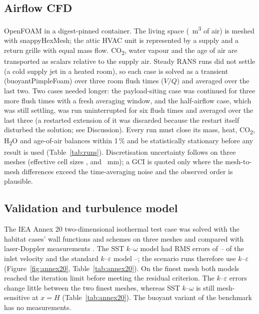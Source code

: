 \documentclass[11pt]{article}
\begin{document}
\subsection{Airflow CFD}
OpenFOAM \citep{openfoam2606} in a digest-pinned container. The living space (\BaseVolume{}~m\textsuperscript{3}
of air) is meshed with snappyHexMesh; the attic HVAC unit is represented by a supply and a return grille with equal
mass flow. CO\textsubscript{2}, water vapour and the age of air are transported as scalars relative to the supply
air. Steady RANS runs did not settle (a cold supply jet in a heated room), so each case is solved as a transient
(buoyantPimpleFoam) over three room flush times ($V/Q$) and averaged over the last two. Two cases needed longer:
the payload-siting case was continued for three more flush times with a fresh averaging window, and the half-airflow
case, which was still settling, was run uninterrupted for six flush times and averaged over the last three (a
restarted extension of it was discarded because the restart itself disturbed the solution; see Discussion). Every run must close its mass, heat,
CO\textsubscript{2}, H\textsubscript{2}O and age-of-air balances within 1\,\% and be statistically stationary before
any result is used (Table~\ref{tab:runs}). Discretisation uncertainty follows \citet{celik2008gci} on three meshes (effective cell sizes
\GciHFine, \GciHMed{} and \GciHCoarse~mm); a GCI is quoted only where the mesh-to-mesh differences exceed the
time-averaging noise and the observed order is plausible.

\begin{table}[tbp]
\centering
\caption{CFD runs. $Q$: supply airflow; $\tau_n = V/Q$: nominal time constant (one room flush time); averaged: the
time window of the reported means, in flush times; balance error: the largest relative error of the heat, CO\textsubscript{2},
H\textsubscript{2}O and age-of-air balances at the return grille; stationary: the two halves of the averaging window
agree. Only runs that pass every gate are used.}
\label{tab:runs}
\resizebox{\textwidth}{!}{}
\end{table}

\subsection{Validation and turbulence model}
The IEA Annex 20 two-dimensional isothermal test case \citep{nielsen1990annex20} was solved with the habitat cases'
wall functions and schemes on three meshes and compared with laser-Doppler measurements \citep{aalborg2006lda}.
The SST $k$--$\omega$ model \citep{menter1994} had RMS errors of \SstLo--\SstHi{} of the inlet velocity and the
standard $k$--$\varepsilon$ model \citep{launder1974} \KeLo--\KeHi; the scenario runs therefore use
$k$--$\varepsilon$ (Figure~\ref{fig:annex20}, Table~\ref{tab:annex20}). On the finest mesh both models reached the
iteration limit before meeting the residual criterion. The $k$--$\varepsilon$ errors change little between the two finest
meshes, whereas SST $k$--$\omega$ is still mesh-sensitive at $x = H$ (Table~\ref{tab:annex20}). The buoyant variant of the benchmark has
no measurements.
\end{document}

